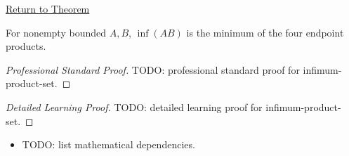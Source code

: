 \newpage
{}
\label{prf:infimum-product-set}

\begin{remark*}[Return]
\hyperref[thm:infimum-product-set]{Return to Theorem}
\end{remark*}

\begin{theorem*}
For nonempty bounded $A,B$, $\inf(AB)$ is the minimum of the four endpoint
products.
\end{theorem*}

\begin{proof}[Professional Standard Proof]
\LRAProofBodyStart
TODO: professional standard proof for infimum-product-set.
\end{proof}

\begin{proof}[Detailed Learning Proof]
\LRAProofBodyStart
TODO: detailed learning proof for infimum-product-set.
\end{proof}

\begin{remark*}
\end{remark*}

\begin{dependencies}
\begin{itemize}
  \item TODO: list mathematical dependencies.
\end{itemize}
\end{dependencies}

\clearpage
